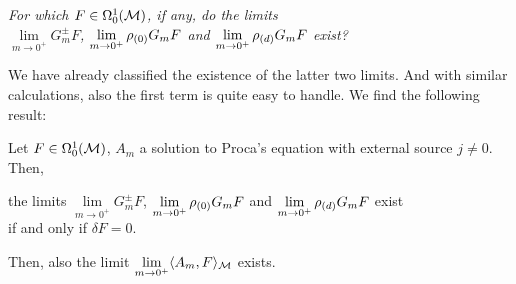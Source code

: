 \begin{center}\textit{
		For which $F \in \Omega^1_0(\mathcal{M})$, if any, do the limits \\ $\lim\limits_{m \to 0^+} G_m^\pm F$, $\lim\limits_{m \to 0^+} \rho_{(0)} G_m F$ and  $\lim\limits_{m \to 0^+} \rho_{(d)} G_m F$ exist?}
\end{center}
We have already classified the existence of the latter two limits. And with similar calculations, also the first term is quite easy to handle. We find the following result:
\begin{theorem}\label{thm:limit_existence_general_classical}
	Let $F \in \Omega^1_0(\mathcal{M})$, $A_m$ a solution to Proca's equation with external source $j\neq0$. Then,
	\begin{center}
		the limits $\lim\limits_{m \to 0^+} G_m^\pm F$, $\lim\limits_{m \to 0^+} \rho_{(0)} G_m F$ and  $\lim\limits_{m \to 0^+} \rho_{(d)} G_m F$ exist\\[2.5mm]
		if and only if ${\delta F} = 0 $.
	\end{center}
	Then, also the limit $\lim\limits_{m \to 0^+} \langle A_m, F \rangle_{\mathcal{M}}$ exists.
\end{theorem}
